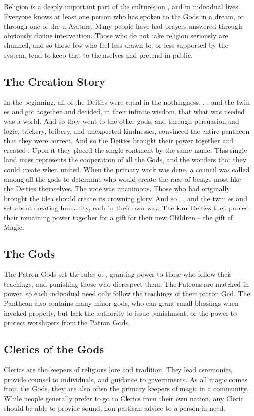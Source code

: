 \documentclass[blue]{GL2020}
\begin{document}
Religion is a deeply important part of the cultures on \pEarth{}, and in individual lives. Everyone knows at least one person who has spoken to the Gods in a dream, or through one of the \pEarth{}n Avatars. Many people have had prayers answered through obviously divine intervention. Those who do not take religion seriously are shunned, and so those few who feel less drawn to, or less supported by the system, tend to keep that to themselves and pretend in public.


\subsection*{The Creation Story}
In the beginning, all of the Deities were equal in the nothingness. \cFarmGod{}, \cTechGod{}, and the twin \cEbb{\God}es \cEbb{} and \cFlow{} got together and decided, in their infinite wisdom, that what was needed was a world. And so they went to the other gods, and through persuasion and logic, trickery, bribery, and unexpected kindnesses, convinced the entire pantheon that they were correct. And so the Deities brought their power together and created \pEarth{}. Upon it they placed the single continent by the same name. This single land mass represents the cooperation of all the Gods, and the wonders that they could create when united. When the primary work was done, a council was called among all the gods to determine who would create the race of beings most like the Deities themselves. The vote was unanimous. Those who had originally brought the idea should create its crowning glory. And so \cFarmGod{}, \cTechGod{}, and the twin \cEbb{\God}es \cEbb{} and \cFlow{} set about creating humanity, each in their own way. The four Deities then pooled their remaining power together for a gift for their new Children -- the gift of Magic.

\subsection*{The Gods}
The Patron Gods set the rules of \pEarth{}, granting power to those who follow their teachings, and punishing those who disrespect them. The Patrons are matched in power, so each individual need only follow the teachings of their patron God. The Pantheon also contains many minor gods, who can grant small blessings when invoked properly, but lack the authority to issue punishment, or the power to protect worshipers from the Patron Gods.

\subsection*{Clerics of the Gods}
Clerics are the keepers of religious lore and tradition. They lead ceremonies, provide counsel to individuals, and guidance to governments. As all magic comes from the Gods, they are also often the primary keepers of magic in a community. While people generally prefer to go to Clerics from their own nation, any Cleric should be able to provide sound, non-partisan advice to a person in need.
\end{document}
